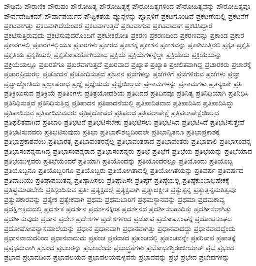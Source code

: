 {ಪೌಢಿಮೆ
ಪೌರಾಣಿಕ
ಪೌರುಷಂ
ಪೌರೋಹಿತ್ಯ
ಪೌರೋಹಿತ್ಯಕ್ಕೆ
ಪೌರೋಹಿತ್ಯಗಳಿಂದ
ಪೌರೋಹಿತ್ಯವನ್ನು
ಪೌರೋಹಿತ್ಯವೂ
ಪೌರ್ವದೇಹಿಕಮ್
ಪೌರ್ವಾಪರ್ಯದ
ಪೌಷ್ಟಿಕತೆಯ
ಪ್ಯೂನ್ಗಳನ್ನು
ಪ್ಯೂನ್ಗಳಿಗೆ
ಪ್ರಕಟಗೊಂಡಿವೆ
ಪ್ರಕಟಣೆಯಲ್ಲಿ
ಪ್ರಕಟನೆಗೆ
ಪ್ರಕಟವಾಗಿತ್ತು
ಪ್ರಕಟವಾಗಿದೆಯೆಂದರೆ
ಪ್ರಕಟವಾಗುತ್ತದೆ
ಪ್ರಕಟವಾಗುವ
ಪ್ರಕಟವಾದಾಗ
ಪ್ರಕಟಿಸಿದ್ದಾರೆ
ಪ್ರಕಟಿಸುತ್ತಿರುವುದು
ಪ್ರಕಟಿಸುವುದರೊಂದಿಗೆ
ಪ್ರಕಟೀಕರೋತಿ
ಪ್ರಕರಣ
ಪ್ರಕರಣದಿಂದ
ಪ್ರಕರಣವನ್ನು
ಪ್ರಕಾಂಡ
ಪ್ರಕಾರ
ಪ್ರಕಾರಗಳಲ್ಲಿ
ಪ್ರಕಾರಗಳಲ್ಲಿಯೂ
ಪ್ರಕಾರಗಳು
ಪ್ರಕಾರದ
ಪ್ರಕಾಶಕ್ಕೆ
ಪ್ರಕಾಶನ
ಪ್ರಕಾಶವನ್ನು
ಪ್ರಕಾಶಿಸುತ್ತಿರಲಿ
ಪ್ರಕೃತ
ಪ್ರಕೃತಿ
ಪ್ರಕೃತಿಯ
ಪ್ರಕೃತಿಯಲ್ಲಿ
ಪ್ರಕೃತೋಪಯೋಗಿಯಾದ
ಪ್ರಕ್ರಿಯೆ
ಪ್ರಕ್ರಿಯೆಗಳನ್ನೆಲ್ಲಾ
ಪ್ರಕ್ರಿಯೆಯ
ಪ್ರಕ್ರಿಯೆಯನ್ನು
ಪ್ರಕ್ರಿಯೆಯಲ್ಲೂ
ಪ್ರಖರತೆಗೂ
ಪ್ರಖರವಾಗುತ್ತದೆ
ಪ್ರಖರವಾದ
ಪ್ರಖ್ಯಾತ
ಪ್ರಖ್ಯಾತಿ
ಪ್ರಚಲಿತವಾಗಿದ್ದ
ಪ್ರಚಾರಕರು
ಪ್ರಚಾರಕ್ಕೆ
ಪ್ರಚಾರಪ್ರಿಯರಲ್ಲ
ಪ್ರಚೋದನೆ
ಪ್ರಚೋದಿಸುತ್ತದೆ
ಪ್ರಜನನ
ಪ್ರಜೆಗಳನ್ನು
ಪ್ರಜೆಗಳಿಗೆ
ಪ್ರಜೆಗಳಿರುವ
ಪ್ರಜೆಗಳು
ಪ್ರಜ್ಞಾ
ಪ್ರಜ್ಞಾಜ್ಯೋತಿಯ
ಪ್ರಜ್ಞಾಪರಾಧ
ಪ್ರಜ್ಞೆ
ಪ್ರಜ್ಞೆಯದು
ಪ್ರಜ್ಞೆಯಿಲ್ಲದೇ
ಪ್ರಣಾಮಗಳನ್ನು
ಪ್ರಣಾಮಗಳು
ಪ್ರತನ್ಯಂತೇ
ಪ್ರತಿ
ಪ್ರತಿಕ್ರಿಯಿಸುವ
ಪ್ರತಿಕ್ರಿಯೆ
ಪ್ರತಿತಿಂಗಳು
ಪ್ರತಿತ್ರಯೋದಶಿಯ
ಪ್ರತಿದಿನದ
ಪ್ರತಿದಿನವೂ
ಪ್ರತಿನಿತ್ಯ
ಪ್ರತಿನಿಧಿಯಾಗಿ
ಪ್ರತಿನಿಧಿಸಿ
ಪ್ರತಿನಿಧಿಸುತ್ತವೆ
ಪ್ರತಿನಿಧಿಸುತ್ತಿದ್ದ
ಪ್ರತಿಪಾದನ
ಪ್ರತಿಪಾದನೆಯಲ್ಲಿ
ಪ್ರತಿಪಾದಿತವಾದ
ಪ್ರತಿಪಾದಿಸಿದ
ಪ್ರತಿಪಾದಿಸಿದ್ದು
ಪ್ರತಿಪಾದಿಸುವ
ಪ್ರತಿಪಾದಿಸುವವರು
ಪ್ರತಿಪ್ರದೋಷದ
ಪ್ರತಿಫಲದ
ಪ್ರತಿಫಲಾಪೇಕ್ಷೆ
ಪ್ರತಿಫಲಾಪೇಕ್ಷೆಯಿಲ್ಲದ
ಪ್ರತಿಫಲಿತವಾಗಿದೆ
ಪ್ರತಿಬಾರಿ
ಪ್ರತಿಭಟನೆ
ಪ್ರತಿಭಟಿಸಬೇಕು
ಪ್ರತಿಭಟಿಸಲು
ಪ್ರತಿಭಟಿಸಿದ
ಪ್ರತಿಭಟಿಸಿದೆ
ಪ್ರತಿಭಟಿಸುತ್ತೇವೆ
ಪ್ರತಿಭಟಿಸುವವರು
ಪ್ರತಿಭಟಿಸುವುದು
ಪ್ರತಿಭಾ
ಪ್ರತಿಭಾಕೌಶಲ್ಯದಿಂದಲೇ
ಪ್ರತಿಭಾನ್ವಿತನೂ
ಪ್ರತಿಭಾಪ್ರಕಾಶಕ್ಕೆ
ಪ್ರತಿಭಾಪ್ರಕಾಶವೆಂಬ
ಪ್ರತಿಭಾರತ್ನ
ಪ್ರತಿಭಾವಂತರನ್ನೆಲ್ಲ
ಪ್ರತಿಭಾವಂತರಾದ
ಪ್ರತಿಭಾವಂತರು
ಪ್ರತಿಭಾಶಾಲಿ
ಪ್ರತಿಭಾಸಂಪನ್ನ
ಪ್ರತಿಭಾಸಂಪನ್ನನಾಗಿದ್ದ
ಪ್ರತಿಭಾಸಂಪನ್ನರಾದ
ಪ್ರತಿಭಾಸಂಪನ್ನರು
ಪ್ರತಿಭೆ
ಪ್ರತಿಭೆಗೆ
ಪ್ರತಿಭೆಯ
ಪ್ರತಿಭೆಯನ್ನು
ಪ್ರತಿಭೆಯಾದ
ಪ್ರತಿಭೆಯುಳ್ಳವರು
ಪ್ರತಿಭೆಯೆಂದರೆ
ಪ್ರತಿಯಾಗಿ
ಪ್ರತಿಯೊಂದನ್ನು
ಪ್ರತಿಯೊಂದರಲ್ಲೂ
ಪ್ರತಿಯೊಂದು
ಪ್ರತಿಯೊಬ್ಬ
ಪ್ರತಿಯೊಬ್ಬನೂ
ಪ್ರತಿಯೊಬ್ಬರಿಗೂ
ಪ್ರತಿಯೊಬ್ಬರು
ಪ್ರತಿಯೋಗಿತಾದಲ್ಲಿ
ಪ್ರತಿಯೋಗಿತೆಯನ್ನು
ಪ್ರತಿವರ್ಷ
ಪ್ರತಿವರ್ಷದ
ಪ್ರತಿವಾದಿಯು
ಪ್ರತಿಷ್ಠಾಪಯಿತವ್ಯ
ಪ್ರತಿಷ್ಠಾಪಿಸಲು
ಪ್ರತಿಷ್ಠಾಪಿಸೇ
ಪ್ರತಿಷ್ಠೆಗೆ
ಪ್ರತಿಷ್ಠೆಯಲ್ಲ
ಪ್ರತಿಷ್ಠೆಕುಂಭಾಭಿಷೇಕಕ್ಕೆ
ಪ್ರತಿಷ್ಥೆಮಾಡಬೇಕು
ಪ್ರತಿಸ್ಪಂದಿಸುವ
ಪ್ರತೀ
ಪ್ರತ್ಯಕ್ಷದಲ್ಲೆ
ಪ್ರತ್ಯಕ್ಷವಾಗಿ
ಪ್ರತ್ಯಾಚಕ್ಷೀತ
ಪ್ರತ್ಯುತ್ಪನ್ನ
ಪ್ರತ್ಯುತ್ಪನ್ನಮತಿತ್ವವೂ
ಪ್ರತ್ಯುಪಕಾರವನ್ನು
ಪ್ರತ್ಯೇಕ
ಪ್ರತ್ಯೇಕವಾಗಿ
ಪ್ರಥಮ
ಪ್ರಥಮಬಾರಿಗೆ
ಪ್ರಥಮಸ್ಥಾನವನ್ನು
ಪ್ರಥಮಾ
ಪ್ರಥಮಕಾವ್ಯ
ಪ್ರದಕ್ಷಿಣಕ್ರಮದಲ್ಲಿ
ಪ್ರದರ್ಶಕ
ಪ್ರದರ್ಶನ
ಪ್ರದರ್ಶನಕ್ಕಿಂತ
ಪ್ರದರ್ಶನದ
ಪ್ರದರ್ಶಿಸಬಹುದಿತ್ತು
ಪ್ರದರ್ಶಿಸಲಾಗಿತ್ತು
ಪ್ರದರ್ಶಿಸುವುದು
ಪ್ರದಾನ
ಪ್ರದೇಶ
ಪ್ರದೇಶಗಳ
ಪ್ರದೇಶಗಳಿಂದ
ಪ್ರದೋಷ
ಪ್ರದೋಷಸಂಘಕ್ಕೆ
ಪ್ರದೋಷಸಂಘದ
ಪ್ರದೋಷೋಪನ್ಯಾಸಮಾಲೆಯನ್ನು
ಪ್ರಧಾನ
ಪ್ರಧಾನವಾಗಿ
ಪ್ರಧಾನವಾಗಿತ್ತು
ಪ್ರಧಾನವಾದದ್ದು
ಪ್ರಧಾನವಾದದ್ದೆಂದು
ಪ್ರಧಾನವಾದುದರಿಂದ
ಪ್ರಧಾನವಾದುದು
ಪ್ರಪಂಚ
ಪ್ರಪಂಚದ
ಪ್ರಪಂಚದಲ್ಲಿ
ಪ್ರಪಂಚವನ್ನೇ
ಪ್ರಪರಿತಾಪ
ಪ್ರಪಾತಕ್ಕೆ
ಪ್ರಪ್ರಥಮವಾಗಿ
ಪ್ರಬಂಧ
ಪ್ರಬಲರನ್ನು
ಪ್ರಬಲವೆಂದು
ಪ್ರಬುದ್ಧತೆಗಳು
ಪ್ರಬೋಧಕಶ್ಚಿರಂಜೀಯಾತ್
ಪ್ರಭ
ಪ್ರಭಂಧ
ಪ್ರಭಾವ
ಪ್ರಭಾವದಿಂದ
ಪ್ರಭಾವಲಯದ
ಪ್ರಭಾವಲಯವುಳ್ಳವನು
ಪ್ರಭಾವವನ್ನು
ಪ್ರಭೆ
ಪ್ರಭೇದ
ಪ್ರಭೇದಗಳನ್ನು
}
